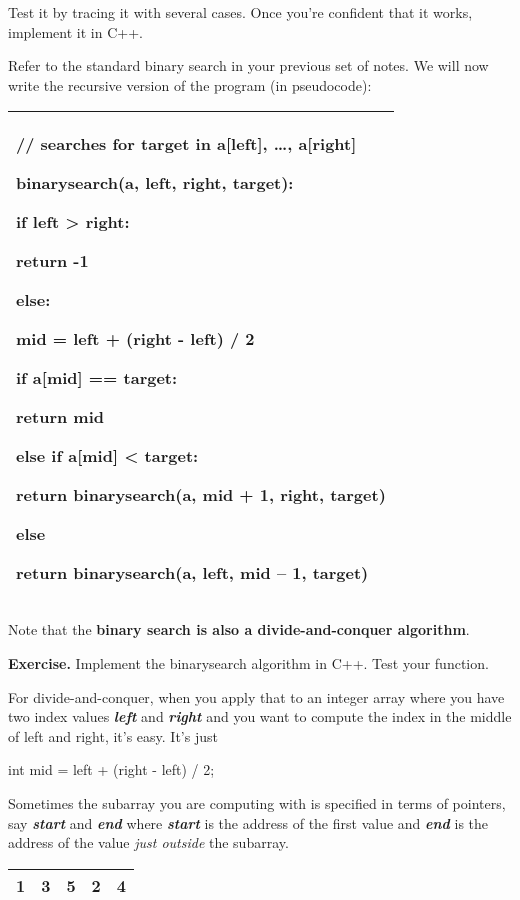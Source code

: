 \documentclass[
]{article}
\begin{document}
Test it by tracing it with several cases. Once you're confident that it
works, implement it in C++.

Refer to the standard binary search in your previous set of notes. We
will now write the recursive version of the program (in pseudocode):

\begin{longtable}[]{@{}l@{}}
\toprule
\endhead
\begin{minipage}[t]{0.97\columnwidth}\raggedright
// searches for target in a{[}left{]}, \ldots, a{[}right{]}

binarysearch(a, left, right, target):

if left \textgreater{} right:

return -1

else:

mid = left + (right - left) / 2

if a{[}mid{]} == target:

return mid

else if a{[}mid{]} \textless{} target:

return binarysearch(a, mid + 1, right, target)

else

return binarysearch(a, left, mid -- 1, target)\strut
\end{minipage}\tabularnewline
\bottomrule
\end{longtable}

Note that the \textbf{binary search is also a divide-and-conquer
algorithm}.

\textbf{Exercise.} Implement the binarysearch algorithm in C++. Test
your function.

For divide-and-conquer, when you apply that to an integer array where
you have two index values \emph{\textbf{left}} and \emph{\textbf{right}}
and you want to compute the index in the middle of left and right, it's
easy. It's just

int mid = left + (right - left) / 2;

Sometimes the subarray you are computing with is specified in terms of
pointers, say \emph{\textbf{start}} and \emph{\textbf{end}} where
\emph{\textbf{start}} is the address of the first value and
\emph{\textbf{end}} is the address of the value \emph{just outside} the
subarray.

\begin{longtable}[]{@{}lllll@{}}
\toprule
\endhead
1 & 3 & 5 & 2 & 4\tabularnewline
\bottomrule
\end{longtable}
\end{document}
